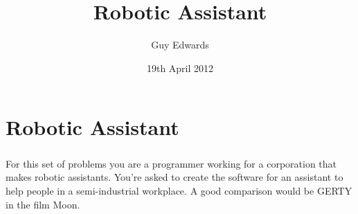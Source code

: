 \documentclass[11pt]{book}
\author{Guy Edwards}
\date{19th April 2012}
\title{Robotic Assistant}
\begin{document}

\chapter{Robotic Assistant}

\paragraph{} For this set of problems you are a programmer working for a
corporation that makes robotic assistants. You're asked to create the software
for an assistant to help people in a semi-industrial workplace. A good
comparison would be GERTY in the film Moon.

\clearpage
\end{document}
